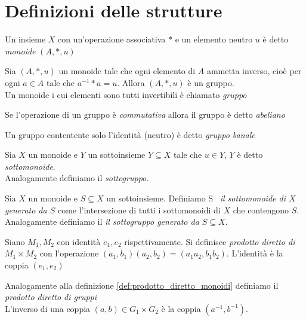     \section{Definizioni delle strutture}
        \begin{definition}[Monoide]\label{def:monoide}
            Un insieme $X$ con un'operazione associativa $*$ e un elemento neutro $u$ è detto \emph{monoide} $(A,*,u)$
        \end{definition}
        \begin{definition}[Gruppo]
            Sia $(A,*,u)$ un monoide tale che ogni elemento di $A$ ammetta inverso, cioè per ogni $a \in A$ tale che $a^{-1}*a = u$. Allora $(A,*,u)$ è un gruppo.\\
            Un monoide i cui elementi sono tutti invertibili è chiamato \emph{gruppo}
        \end{definition}
        \begin{definition}
            Se l'operazione di un gruppo è \emph{commutativa} allora il gruppo è detto \emph{abeliano}
        \end{definition}
        \begin{definition}
            Un gruppo contentente solo l'identità (neutro) è detto \emph{gruppo banale}
        \end{definition}
        \begin{definition}
            Sia $X$ un monoide e $Y$ un sottoinsieme $Y \subseteq X$ tale che $u \in Y$, $Y$ è detto \emph{sottomonoide}.\\
            Analogamente definiamo il \emph{sottogruppo}.
        \end{definition}
        \begin{definition}
            Sia $X$ un monoide e $S \subseteq X$ un sottoinsieme. Definiamo \textlangle S \textrangle \ \emph{il sottomonoide di $X$ generato da $S$}
            come l'intersezione di tutti i sottomonoidi di $X$ che contengono $S$.\\
            Analogamente definiamo il \emph{il sottogruppo generato da $S \subseteq X$}.
        \end{definition}
        \begin{definition}\label{def:prodotto_diretto_monoidi}
            Siano $M_1, M_2$ con identità $e_1,e_2$ rispettivamente.
            Si definisce \emph{prodotto diretto di $M_1 \times M_2$} con l'operazione $(a_1,b_1)(a_2,b_2)=(a_1a_2, b_1b_2).$
            L'identità è la coppia $(e_1,e_2)$
        \end{definition}
        \begin{definition}
            Analogamente alla definizione \ref{def:prodotto_diretto_monoidi} definiamo il \emph{prodotto diretto di gruppi}\\
            L'inverso di una coppia $(a,b) \in G_1 \times G_2$ è la coppia $(a^{-1}, b^{-1})$.
        \end{definition}


